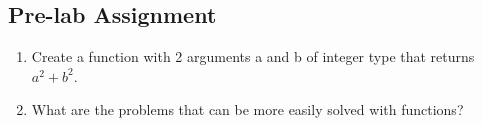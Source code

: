 \subsection{Pre-lab Assignment}
\begin{enumerate}
    \item Create a function with 2 arguments a and b of integer type that returns $a^2 + b^2$.
    \item What are the problems that can be more easily solved with functions?
\end{enumerate}

